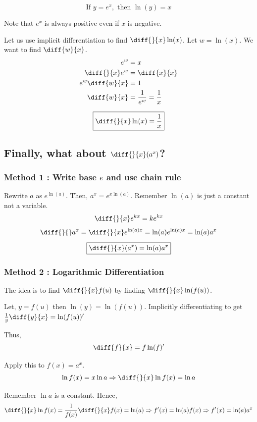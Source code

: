$$
\boxed{\text{If } y = e^x, \text{ then } \ln(y) = x} 
$$

Note that $e^x$ is always positive even if $x$ is negative.

Let us use implicit differentiation to find $\diff{}{x} \ln(x)$. Let $w = \ln(x)$. We want to find $\diff{w}{x}$.
\begin{equation*}
\begin{split}
	e^w & = x \\
	\diff{}{x} e^w & = \diff{x}{x} \\
	e^w \diff{w}{x} & = 1 \\
	\diff{w}{x} & = \frac{1}{e^w} = \frac{1}{x} \\
\end{split}
\end{equation*}

$$
\boxed{\diff{}{x} \ln(x) = \frac{1}{x}} 
$$

\subsection*{Finally, what about $\diff{}{x}(a^x)$?} 

\subsubsection{Method 1 : Write base $e$ and use chain rule}

Rewrite $a$ as $e^{\ln(a)}$. 
Then, $ a^x = e^{x \ln(a)} $.
Remember $\ln(a)$ is just a constant not a variable.
$$ \diff{}{x} e^{kx} = ke^{kx} $$
$$ \diff{}{} a^x = \diff{}{x} e^{\ln(a)x} = \ln(a)e^{\ln(a)x} = \ln(a)a^x $$
$$ \boxed{\diff{}{x}(a^x) = \ln(a)a^x}$$


\subsubsection{Method 2 : Logarithmic Differentiation}

The idea is to find $\diff{}{x}f(u)$ by finding $\diff{}{x} \ln(f(u))$.

Let, $y = f(u)$ then $\ln(y) = \ln(f(u))$.
Implicitly differentiating to get $\frac{1}{y}\diff{y}{x} = \ln(f(u))'$

Thus, $$\diff{f}{x} = f\ln(f)'$$

Apply this to $f(x) = a^x$.
$$ \ln f(x) = x \ln a \Rightarrow \diff{}{x} \ln f(x) = \ln a $$

Remember $\ln a$ is a constant. Hence, 
$$ \diff{}{x} \ln f(x) = \frac{1}{f(x)} \diff{}{x} f(x) = \ln (a) \Rightarrow f'(x) = \ln(a)f(x) \Rightarrow f'(x) = \ln(a)a^x $$


